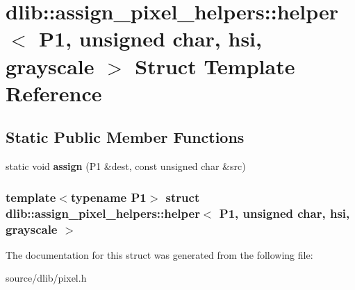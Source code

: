 \hypertarget{structdlib_1_1assign__pixel__helpers_1_1helper_3_01P1_00_01unsigned_01char_00_01hsi_00_01grayscale_01_4}{
\section{dlib::assign\_\-pixel\_\-helpers::helper$<$ P1, unsigned char, hsi, grayscale $>$ Struct Template Reference}
\label{structdlib_1_1assign__pixel__helpers_1_1helper_3_01P1_00_01unsigned_01char_00_01hsi_00_01grayscale_01_4}
}
\subsection*{Static Public Member Functions}
\begin{DoxyCompactItemize}
\item 
\hypertarget{structdlib_1_1assign__pixel__helpers_1_1helper_3_01P1_00_01unsigned_01char_00_01hsi_00_01grayscale_01_4_a7b04f26ace3205e6da4133c0ea4f4c53}{
static void {\bfseries assign} (P1 \&dest, const unsigned char \&src)}
\label{structdlib_1_1assign__pixel__helpers_1_1helper_3_01P1_00_01unsigned_01char_00_01hsi_00_01grayscale_01_4_a7b04f26ace3205e6da4133c0ea4f4c53}

\end{DoxyCompactItemize}
\subsubsection*{template$<$typename P1$>$ struct dlib::assign\_\-pixel\_\-helpers::helper$<$ P1, unsigned char, hsi, grayscale $>$}



The documentation for this struct was generated from the following file:\begin{DoxyCompactItemize}
\item 
source/dlib/pixel.h\end{DoxyCompactItemize}
